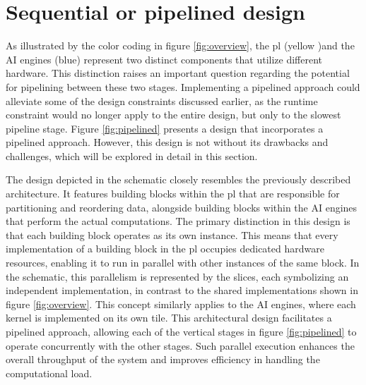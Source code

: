 \section{Sequential or pipelined design}
As illustrated by the color coding in figure \ref{fig:overview}, the \ac{pl} (yellow )and the AI engines (blue) represent two distinct components that utilize different hardware. This distinction raises an important question regarding the potential for pipelining between these two stages. Implementing a pipelined approach could alleviate some of the design constraints discussed earlier, as the runtime constraint would no longer apply to the entire design, but only to the slowest pipeline stage. Figure \ref{fig:pipelined} presents a design that incorporates a pipelined approach. However, this design is not without its drawbacks and challenges, which will be explored in detail in this section.\par
The design depicted in the schematic closely resembles the previously described architecture. It features building blocks within the \ac{pl} that are responsible for partitioning and reordering data, alongside building blocks within the AI engines that perform the actual computations. The primary distinction in this design is that each building block operates as its own instance. This means that every implementation of a building block in the \ac{pl} occupies dedicated hardware resources, enabling it to run in parallel with other instances of the same block. In the schematic, this parallelism is represented by the slices, each symbolizing an independent implementation, in contrast to the shared implementations shown in figure \ref{fig:overview}. This concept similarly applies to the AI engines, where each kernel is implemented on its own tile. This architectural design facilitates a pipelined approach, allowing each of the vertical stages in figure \ref{fig:pipelined} to operate concurrently with the other stages. Such parallel execution enhances the overall throughput of the system and improves efficiency in handling the computational load.\par

